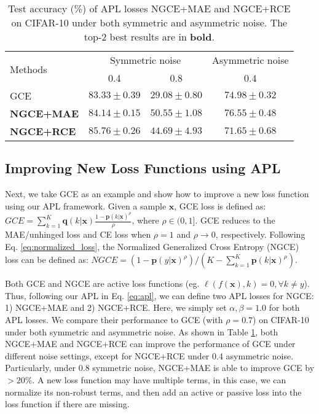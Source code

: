 \documentclass{article}
\def \xx {{\bm{x}}}
\def \pp {{\bm{p}}}
\def \qq {{\bm{q}}}
\begin{document}
\begin{table}[!ht]
\vspace{-0.1 in}
    \small
    \centering
    \caption{Test accuracy (\%) of APL losses NGCE+MAE and NGCE+RCE on CIFAR-10 under both symmetric and asymmetric noise. The top-2 best results are in \textbf{bold}.}
\label{tab:ngce_plus}
    \begin{adjustbox}{width=0.49\textwidth}
    \begin{tabular}{l|cc|c}
    \hline
    \multirow{2}{*}{Methods}
    & \multicolumn{2}{c|}{Symmetric noise}  & \multicolumn{1}{c}{Asymmetric noise} \\
     & 0.4 & 0.8  & 0.4  \\
    \hline
    GCE & $ 83.33\pm0.39 $ & $ 29.08\pm0.80 $ & $ \boldsymbol{74.98\pm0.32} $ \\
    \textbf{NGCE+MAE} & $\boldsymbol{ 84.14\pm0.15 }$ & $\boldsymbol{ 50.55\pm1.08 } $ & $\boldsymbol{ 76.55\pm0.48 }$ \\
    \textbf{NGCE+RCE} & $\boldsymbol{ 85.76\pm0.26 }$ & $\boldsymbol{ 44.69\pm4.93 }$ & $ 71.65\pm0.68 $ \\
    \hline
    \end{tabular}
    \end{adjustbox}
\vspace{-0.1 in}
\end{table}

\subsection{Improving New Loss Functions using APL}\label{sec:ngce}
Next, we take GCE \cite{zhang2018generalized} as an example and show how to improve a new loss function using our APL framework.
Given a sample $\xx$, GCE loss is defined as: $GCE = \sum_{k=1}^{K} \qq(k|\xx)\frac{1-\pp(k|\xx)^\rho}{\rho}$,
where $\rho \in (0, 1]$. GCE reduces to the MAE/unhinged loss and CE loss when $\rho=1$ and $\rho \rightarrow 0$, respectively.
Following Eq. \eqref{eq:normalized_loss}, the Normalized Generalized Cross Entropy (NGCE) loss can be defined as:
$NGCE=(1-\pp(y|\xx)^{\rho})/(K - \sum_{k=1}^{K}\pp(k|\xx)^{\rho}).$


Both GCE and NGCE are active loss functions (eg. $\ell(f(\xx), k) = 0, \forall k \neq y$). Thus, following our APL in Eq. \eqref{eq:apl}, we can define two APL losses for NGCE: 1) NGCE+MAE and 2) NGCE+RCE. Here, we simply set $\alpha,\beta=1.0$ for both APL losses. We compare their performance to GCE (with $\rho=0.7$) on CIFAR-10 under both symmetric and asymmetric noise. As shown in Table \ref{tab:ngce_plus}, both NGCE+MAE and NGCE+RCE can improve the performance of GCE under different noise settings, except for NGCE+RCE under 0.4 asymmetric noise. Particularly, under 0.8 symmetric noise, NGCE+MAE is able to improve GCE by $>20\%$. A new loss function may have multiple terms, in this case, we can normalize its non-robust terms, and then add an active or passive loss into the loss function if there are missing.
\end{document}
